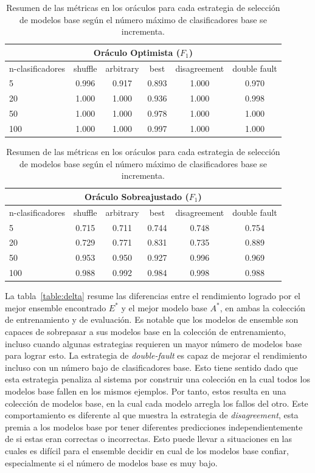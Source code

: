 \begin{table}[H]
    \centering

    \begin{tabular}{lccccc}
    \toprule
        \multicolumn{6}{c}{Oráculo Optimista ($F_1$)} \\ \midrule
        n-clasificadores & shuffle & arbitrary & best & disagreement & double fault  \\ \midrule \midrule
        5   & 0.996 & 0.917 & 0.893 & 1.000 & 0.970 \\
        20  & 1.000 & 1.000 & 0.936 & 1.000 & 0.998 \\
        50  & 1.000 & 1.000 & 0.978 & 1.000 & 1.000 \\
        100 & 1.000 & 1.000 & 0.997 & 1.000 & 1.000 \\
    \bottomrule
    \end{tabular}

    \begin{tabular}{lccccc}
    \toprule
        \multicolumn{6}{c}{Oráculo Sobreajustado ($F_1$)} \\ \midrule
        n-clasificadores & shuffle & arbitrary & best & disagreement & double fault  \\ \midrule \midrule
        5   & 0.715 & 0.711 & 0.744 & 0.748 & 0.754 \\
        20  & 0.729 & 0.771 & 0.831 & 0.735 & 0.889 \\
        50  & 0.953 & 0.950 & 0.927 & 0.996 & 0.969 \\
        100 & 0.988 & 0.992 & 0.984 & 0.998 & 0.988 \\
    \bottomrule
    \end{tabular}

    \caption{Resumen de las métricas en los oráculos para cada estrategia de selección de modelos base según el número máximo de clasificadores base se incrementa.}
    \label{table:oracle}
\end{table}

La tabla~\ref{table:delta} resume las diferencias entre el rendimiento logrado por el mejor ensemble encontrado $E^*$ y el mejor modelo base $A^*$, en ambas la colección de entrenamiento y de evaluación.
Es notable que los modelos de ensemble son capaces de sobrepasar a sus modelos base en la colección de entrenamiento, incluso cuando algunas estrategias requieren un mayor número de modelos base para lograr esto.
La estrategia de \emph{double-fault} es capaz de mejorar el rendimiento incluso con un número bajo de clasificadores base.
Esto tiene sentido dado que esta estrategia penaliza al sistema por construir una colección en la cual todos los modelos base fallen en los mismos ejemplos.
Por tanto, estos resulta en una colección de modelos base, en la cual cada modelo arregla los fallos del otro.
Este comportamiento es diferente al que muestra la estrategia de \emph{disagreement}, esta premia a los modelos base por tener diferentes predicciones independientemente de si estas eran correctas o incorrectas.
Esto puede llevar a situaciones en las cuales es difícil para el ensemble decidir en cual de los modelos base confiar, especialmente si el número de modelos base es muy bajo.

